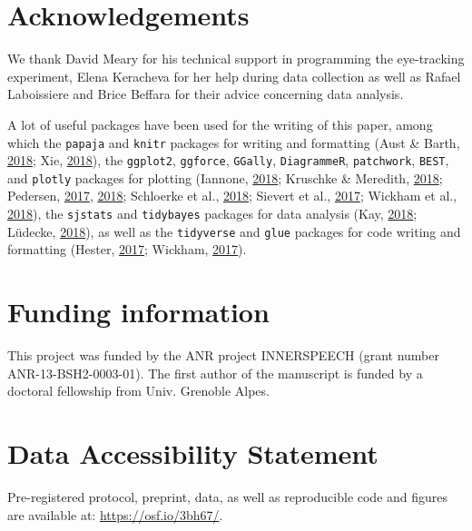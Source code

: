 \documentclass[a4paper,12pt,twoside,openright,oldfontcommands]{memoir}
\begin{document}
\hypertarget{acknowledgements-3}{%
\section{Acknowledgements}\label{acknowledgements-3}}

We thank David Meary for his technical support in programming the eye-tracking experiment, Elena Keracheva for her help during data collection as well as Rafael Laboissiere and Brice Beffara for their advice concerning data analysis.

A lot of useful packages have been used for the writing of this paper, among which the \texttt{papaja} and \texttt{knitr} packages for writing and formatting (Aust \& Barth, \protect\hyperlink{ref-R-papaja}{2018}; Xie, \protect\hyperlink{ref-R-knitr}{2018}), the \texttt{ggplot2}, \texttt{ggforce}, \texttt{GGally}, \texttt{DiagrammeR}, \texttt{patchwork}, \texttt{BEST}, and \texttt{plotly} packages for plotting (Iannone, \protect\hyperlink{ref-R-DiagrammeR}{2018}; Kruschke \& Meredith, \protect\hyperlink{ref-R-BEST}{2018}; Pedersen, \protect\hyperlink{ref-R-patchwork}{2017}, \protect\hyperlink{ref-R-ggforce}{2018}; Schloerke et al., \protect\hyperlink{ref-R-GGally}{2018}; Sievert et al., \protect\hyperlink{ref-R-plotly}{2017}; Wickham et al., \protect\hyperlink{ref-R-ggplot2}{2018}), the \texttt{sjstats} and \texttt{tidybayes} packages for data analysis (Kay, \protect\hyperlink{ref-R-tidybayes}{2018}; Lüdecke, \protect\hyperlink{ref-R-sjstats}{2018}), as well as the \texttt{tidyverse} and \texttt{glue} packages for code writing and formatting (Hester, \protect\hyperlink{ref-R-glue}{2017}; Wickham, \protect\hyperlink{ref-R-tidyverse}{2017}).

\hypertarget{funding-information}{%
\section{Funding information}\label{funding-information}}

This project was funded by the ANR project INNERSPEECH (grant number ANR-13-BSH2-0003-01). The first author of the manuscript is funded by a doctoral fellowship from Univ. Grenoble Alpes.

\hypertarget{suppCh6}{%
\section{Data Accessibility Statement}\label{suppCh6}}

Pre-registered protocol, preprint, data, as well as reproducible code and figures are available at: \href{http://osf.io/3bh67}{https://osf.io/3bh67/}.
\end{document}
